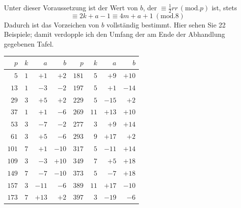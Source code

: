 \endgroup
Unter dieser Voraussetzung ist der Wert von $b$, der $\equiv\frac12rr\, (\mathrm{mod}.p)$ ist, stets
\[
{}\equiv2k+a-1\equiv4m+a+1\ (\mathrm{mod}.8)
\]
Dadurch ist das Vorzeichen von $b$ vollständig bestimmt. Hier sehen Sie 22 Beispiele; damit verdopple ich den Umfang der am Ende der Abhandlung gegebenen Tafel.
\begin{center}
\begin{tabular}{r|r|r|r||r|r|r|r}
$p$&$k$&$a$&$b$&$p$&$k$&$a$&$b$\\\hline
$5$&$1$&$+1$&$+2$&$181$&$5$&$+9$&$+10$\\
$13$&$1$&$-3$&$-2$&$197$&$5$&$+1$&$-14$\\
$29$&$3$&$+5$&$+2$&$229$&$5$&$-15$&$+2$\\
$37$&$1$&$+1$&$-6$&$269$&$11$&$+13$&$+10$\\
$53$&$3$&$-7$&$-2$&$277$&$3$&$+9$&$+14$\\
$61$&$3$&$+5$&$-6$&$293$&$9$&$+17$&$+2$\\
$101$&$7$&$+1$&$-10$&$317$&$5$&$-11$&$+14$\\
$109$&$3$&$-3$&$+10$&$349$&$7$&$+5$&$+18$\\
$149$&$7$&$-7$&$-10$&$373$&$5$&$-7$&$+18$\\
$157$&$3$&$-11$&$-6$&$389$&$11$&$+17$&$-10$\\
$173$&$7$&$+13$&$+2$&$397$&$3$&$-19$&$-6$\\
\end{tabular}
\end{center}
